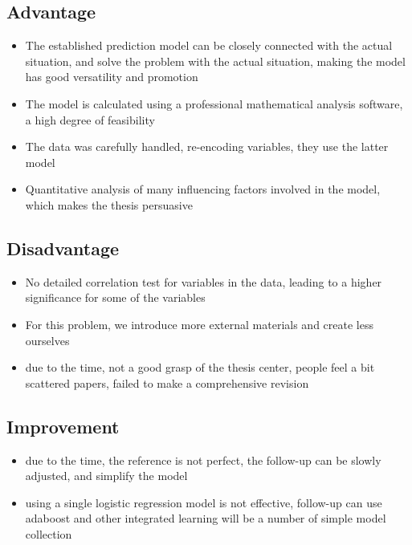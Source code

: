 \documentclass{mcmthesis}
\begin{document}
\subsection{Advantage}
\begin{itemize}
\item The established prediction model can be closely connected with the actual situation, and solve the problem with the actual situation, making the model has good versatility and promotion
\item The model is calculated using a professional mathematical analysis software, a high degree of feasibility
\item The data was carefully handled, re-encoding variables, they use the latter model
\item Quantitative analysis of many influencing factors involved in the model, which makes the thesis persuasive
\end{itemize}
\subsection{Disadvantage}
\begin{itemize}
\item No detailed correlation test for variables in the data, leading to a higher significance for some of the variables
\item For this problem, we introduce more external materials and create less ourselves
\item due to the time, not a good grasp of the thesis center, people feel a bit scattered papers, failed to make a comprehensive revision
\end{itemize}
\subsection{Improvement}
\begin{itemize}
\item due to the time, the reference is not perfect, the follow-up can be slowly adjusted, and simplify the model
\item using a single logistic regression model is not effective, follow-up can use adaboost and other integrated learning will be a number of simple model collection
\end{itemize}

\end{document}

